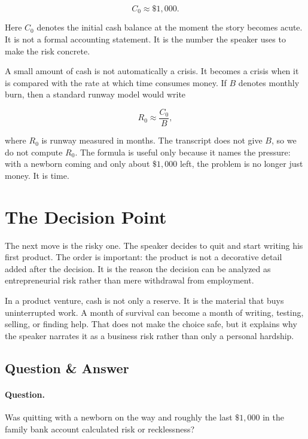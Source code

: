 \begin{equation}
C_0 \approx \$1{,}000 .
\end{equation}

Here \(C_0\) denotes the initial cash balance at the moment the story becomes acute. It is not a formal accounting statement. It is the number the speaker uses to make the risk concrete.

A small amount of cash is not automatically a crisis. It becomes a crisis when it is compared with the rate at which time consumes money. If \(B\) denotes monthly burn, then a standard runway model would write

\begin{equation}
R_0 \approx \frac{C_0}{B},
\end{equation}

where \(R_0\) is runway measured in months. The transcript does not give \(B\), so we do not compute \(R_0\). The formula is useful only because it names the pressure: with a newborn coming and only about \(\$1{,}000\) left, the problem is no longer just money. It is time.

\section{The Decision Point}

The next move is the risky one. The speaker decides to quit and start writing his first product. The order is important: the product is not a decorative detail added after the decision. It is the reason the decision can be analyzed as entrepreneurial risk rather than mere withdrawal from employment.

In a product venture, cash is not only a reserve. It is the material that buys uninterrupted work. A month of survival can become a month of writing, testing, selling, or finding help. That does not make the choice safe, but it explains why the speaker narrates it as a business risk rather than only a personal hardship.

\subsection{Question \& Answer}

\paragraph{Question.}
Was quitting with a newborn on the way and roughly the last \(\$1{,}000\) in the family bank account calculated risk or recklessness?

